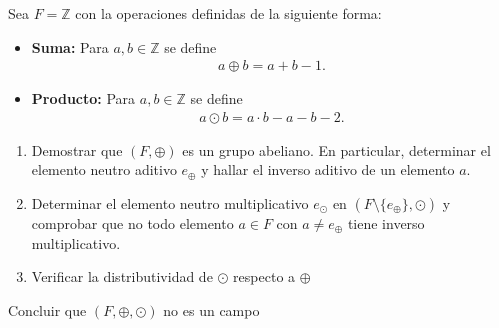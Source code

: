 \documentclass[11pt,letterpaper]{article}
\newcommand{\Z}{\mathbb{Z}}
\begin{document}
\begin{tcolorbox}[
title=Problema 4, 
width=\linewidth, 
coltitle=B, 
colback=B,
colframe=G, 
fonttitle=\bfseries,
]
Sea $F=\Z$ con la operaciones definidas de la siguiente forma:\\
	\begin{itemize}
		\item \textbf{Suma:} Para $a,b\in\Z$ se define
		\begin{align*}
			a\oplus b=a+b-1.
		\end{align*}
		\item \textbf{Producto:} Para $a,b\in\Z$ se define
		\begin{align*}
			a\odot b=a\cdot b-a-b-2.
		\end{align*}
	\end{itemize}

	\begin{enumerate}
		\item Demostrar que $(F,\oplus)$ es un grupo abeliano. En particular, determinar el elemento
		neutro aditivo $e_\oplus$ y hallar el inverso aditivo de un elemento $a$.
		\item Determinar el elemento neutro multiplicativo $e_\odot$ en $(F\setminus\{e_\oplus\},\odot)$ 
		y comprobar que no todo elemento $a\in F$ con $a\neq e_\oplus$ tiene inverso multiplicativo.
		\item Verificar la distributividad de $\odot$ respecto a $\oplus$
	\end{enumerate}
	Concluir que $(F,\oplus, \odot)$ no es un campo 
\end{tcolorbox}\,\\
\end{document}
